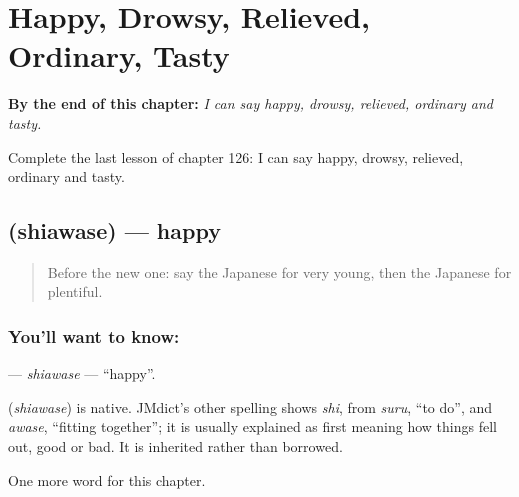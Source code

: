 
\chapter{Happy, Drowsy, Relieved, Ordinary, Tasty}
\label{ch:ja-happy-drowsy-relieved-ordinary-tasty}

\begin{chapteropening}
\textbf{By the end of this chapter:} \emph{I can say happy, drowsy, relieved, ordinary and tasty.}

Complete the last lesson of chapter 126: I can say happy, drowsy, relieved, ordinary and tasty.
\end{chapteropening}

\section[\texorpdfstring{\ja{しあわせ} (shiawase)}{しあわせ (shiawase)}]{ (shiawase) — happy}

\label{lesson:JA-C126-shiawase}



\begin{quote}
Before the new one: say the Japanese for very young, then the Japanese for plentiful.
\end{quote}

\subsection*{You'll want to know: }
\textbf{} — \emph{shiawase} — \textquotedblleft{}happy\textquotedblright{}.

\begin{cousinweb}
\textbf{} (\emph{shiawase}) is native. JMdict's other spelling shows \emph{shi}, from \emph{suru}, \textquotedblleft{}to do\textquotedblright{}, and \emph{awase}, \textquotedblleft{}fitting together\textquotedblright{}; it is usually explained as first meaning how things fell out, good or bad. It is inherited rather than borrowed.
\end{cousinweb}

\begin{grammarlens}[title={What you've built}]
One more word for this chapter.
\end{grammarlens}

